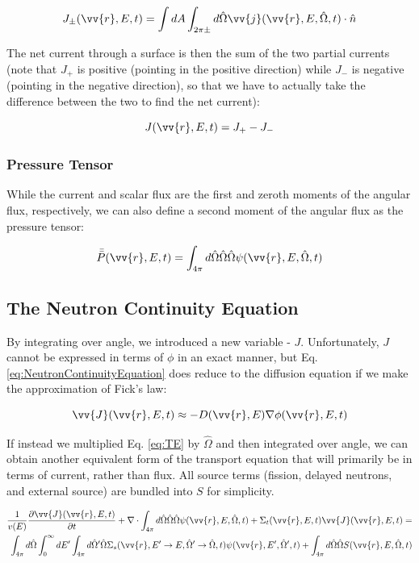 \documentclass[10pt]{article}
\newcommand{\beq}{\begin{equation}}
\newcommand{\eeq}{\end{equation}}
\newcommand{\beqa}{\begin{equation}\begin{aligned}}
\newcommand{\eeqa}{\end{aligned}\end{equation}}
\newcommand{\hO}{\hat{\Omega}}
\newcommand{\spa}{(\vv{r}, E, \hO, t)}
\newcommand{\spas}{(\vv{r},E,t)}
\newcommand{\spap}{(\vv{r}, E', \hO',t)}
\newcommand{\spang}{(\vv{r},E'\rightarrow E, \hO'\rightarrow\hO,t)}
\begin{document}
\begin{flushleft}
\beq
\label{eq:PartialCurrent}
J_\pm \spas = \int dA\int_{2\pi\pm}^{} d\hO   \vv{j}\spa \cdot\hat{n}
\eeq

The net current through a surface is then the sum of the two partial currents (note that \(J_+\) is positive (pointing in the positive direction) while \(J_-\) is negative (pointing in the negative direction), so that we have to actually take the difference between the two to find the net current):

\beq
\label{eq:TotalCurrent}
J \spas = J_+ - J_-
\eeq

\subsubsection{Pressure Tensor}

While the current and scalar flux are the first and zeroth moments of the angular flux, respectively, we can also define a second moment of the angular flux as the pressure tensor:

\beq
\label{eq:PressureTensor}
\bar{\bar{P}}(\vv{r},E,t)=\int_{4\pi}^{}d\hO  \hO  \hO  \psi\spa 
\eeq

\clearpage


\subsection{The Neutron Continuity Equation}


By integrating over angle, we introduced a new variable - \(J\). Unfortunately, \(J\) cannot be expressed in terms of \(\phi\) in an exact manner, but Eq. \ref{eq:NeutronContinuityEquation} does reduce to the diffusion equation if we make the approximation of Fick's law:

\beq
\vv{J}\spas\approx-D(\vv{r},E)\nabla\phi\spas
\eeq

If instead we multiplied Eq. \ref{eq:TE} by \(\hO\) and then integrated over angle, we can obtain another equivalent form of the transport equation that will primarily be in terms of current, rather than flux. All source terms (fission, delayed neutrons, and external source) are bundled into \(S\) for simplicity. 

\beqa
\label{eq:TEAngleAngleIntegrated}
\frac{1}{v(E)} \frac{\partial\vv{J}\spas}{\partial t} +
 \nabla\cdot \int_{4\pi}^{} d\hO  \hO  \hO  \psi\spa  + 
 \Sigma_t\spas\vv{J}\spas = \\
 \int_{4\pi}^{} d\hO\int_{0}^{\infty}dE' \int_{4\pi}^{ } d\hO  ' \hO  \Sigma_s\spang\psi\spap + \int_{4\pi}^{} d\hO  \hO  S\spa\\
\eeqa


\end{flushleft}
\end{document}
